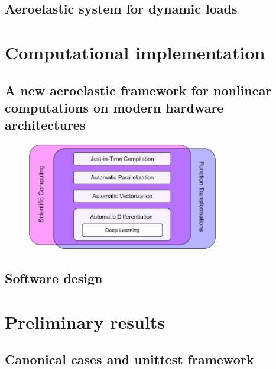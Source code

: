 \documentclass[11pt]{article}
\begin{document}
\subsection{Aeroelastic system for dynamic loads}
\label{sec:orgf3f3512}
\section{Computational implementation}
\label{sec:orgc001cf5}
\subsection{A new aeroelastic framework for nonlinear computations on modern hardware architectures}
\label{sec:org8e8e70b}

\begin{figure}[htbp]
\centering
\includegraphics[width=0.75\textwidth]{./img/JAXfeatures.png}
\caption{\label{fig:org04b5e20}}
\end{figure}
\subsection{Software design}
\label{sec:org99304fa}

\section{Preliminary results}
\label{sec:orgeb19789}
\subsection{Canonical cases and unittest framework}
\label{sec:org9f8fae1}
\end{document}
